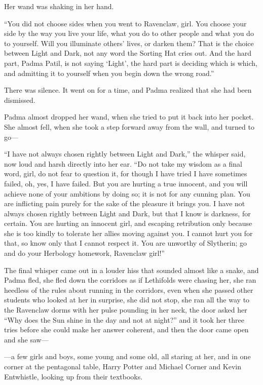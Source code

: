Her wand was shaking in her hand.

“You did not choose sides when you went to Ravenclaw, girl. You choose your side by the way you live your life, what you do to other people and what you do to yourself. Will you illuminate others’ lives, or darken them? That is the choice between Light and Dark, not any word the Sorting Hat cries out. And the hard part, Padma Patil, is not saying ‘Light’, the hard part is deciding which is which, and admitting it to yourself when you begin down the wrong road.”

There was silence. It went on for a time, and Padma realized that she had been dismissed.

Padma almost dropped her wand, when she tried to put it back into her pocket. She almost fell, when she took a step forward away from the wall, and turned to go—

“I have not always chosen rightly between Light and Dark,” the whisper said, now loud and harsh directly into her ear. “Do not take my wisdom as a final word, girl, do not fear to question it, for though I have tried I have sometimes failed, oh, yes, I have failed. But you are hurting a true innocent, and you will achieve none of your ambitions by doing so; it is not for any cunning plan. You are inflicting pain purely for the sake of the pleasure it brings you. I have not always chosen rightly between Light and Dark, but that I know is darkness, for certain. You are hurting an innocent girl, and escaping retribution only because she is too kindly to tolerate her allies moving against you. I cannot hurt you for that, so know only that I cannot respect it. You are unworthy of Slytherin; go and do your Herbology homework, Ravenclaw girl!”

The final whisper came out in a louder hiss that sounded almost like a snake, and Padma fled, she fled down the corridors as if Lethifolds were chasing her, she ran heedless of the rules about running in the corridors, even when she passed other students who looked at her in surprise, she did not stop, she ran all the way to the Ravenclaw dorms with her pulse pounding in her neck, the door asked her “Why does the Sun shine in the day and not at night?” and it took her three tries before she could make her answer coherent, and then the door came open and she saw—

—a few girls and boys, some young and some old, all staring at her, and in one corner at the pentagonal table, Harry Potter and Michael Corner and Kevin Entwhistle, looking up from their textbooks.

